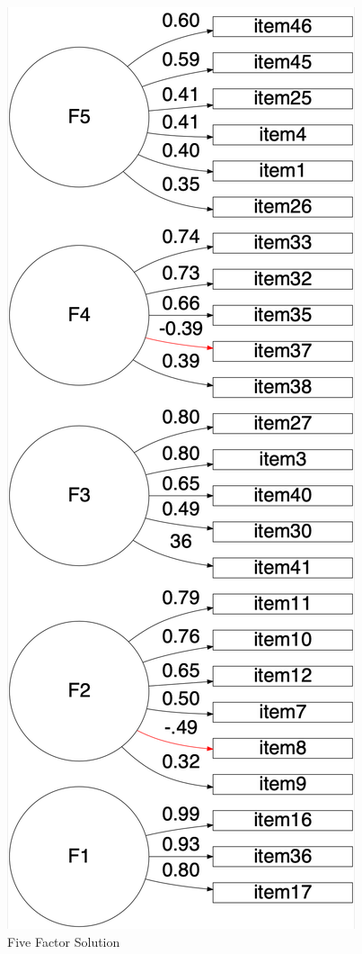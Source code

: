 \documentclass[
  english,
  man]{apa6}
\begin{document}
\begin{figure}

{\centering \includegraphics[width=1.2\linewidth,height=1\textheight]{EFAplot.LR} 

}

\caption{Five Factor Solution}\label{fig:EFAplot}
\end{figure}
\end{document}
